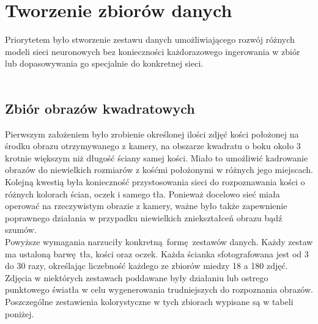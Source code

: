 
\chapter{Tworzenie zbiorów danych}
Priorytetem było stworzenie zestawu danych
umożliwiającego rozwój różnych modeli sieci neuronowych bez konieczności każdorazowego
ingerowania w zbiór lub dopasowywania go specjalnie do konkretnej sieci.\\\\

\section{Zbiór obrazów kwadratowych}
Pierwszym założeniem było zrobienie określonej ilości zdjęć kości położonej na środku
obrazu otrzymywanego z kamery, na obszarze kwadratu o boku około 3 krotnie większym
niż długość ściany samej kości. Miało to umożliwić kadrowanie obrazów
do niewielkich rozmiarów z kośćmi położonymi w różnych jego miejscach.\\
Kolejną kwestią była konieczność przystosowania sieci do rozpoznawania kości o
różnych kolorach ścian, oczek i samego tła. Ponieważ docelowo sieć
miała operować na rzeczywistym obrazie z kamery, ważne było także zapewnienie poprawnego
działania w przypadku niewielkich zniekształceń obrazu bądź szumów.\\
Powyższe wymagania narzuciły konkretną formę zestawów danych.
Każdy zestaw ma ustaloną barwę tła, kości oraz oczek. Każda ścianka sfotografowana jest
od 3 do 30 razy, określając liczebność każdego ze zbiorów miedzy 18 a 180 zdjęć.
Zdjęcia w niektórych zestawach poddawane były działaniu lub ostrego punktowego światła
w celu wygenerowania trudniejszych do rozpoznania obrazów. Poszczególne zestawienia
kolorystyczne w tych zbiorach wypisane są w tabeli poniżej. \newpage

